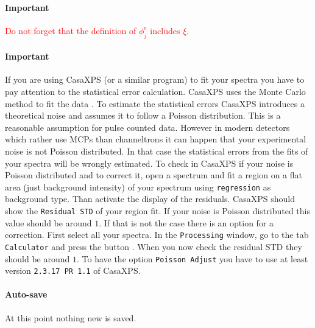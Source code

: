 \documentclass[oldfontcommands,openany,oneside]{memoir}
\newcommand{\red}[1]{\textcolor{red}{#1}}
\begin{document}
\parbox{0.9\linewidth}{\paragraph{Important} \red{Do not forget that the definition of  $\phi_j^e$ includes $\xi$.}}


\parbox{0.9\linewidth}{\paragraph{Important} If you are using CasaXPS (or a similar program) to fit your spectra you have to pay attention to the statistical error calculation. CasaXPS uses the Monte Carlo method to fit the data \cite{Mercurio2013}. To estimate the statistical errors CasaXPS introduces a theoretical noise and assumes it to follow a Poisson distribution. This is a reasonable assumption for pulse counted data. However in modern detectors which rather use MCPs than channeltrons it can happen that your experimental noise is not Poisson distributed. In that case the statistical errors from the fits of your spectra will be wrongly estimated. To check in CasaXPS if your noise is Poisson distributed and to correct it, open a spectrum and fit a region on a flat area (just background intensity) of your spectrum using \texttt{regression} as background type. Than activate the display of the residuals. CasaXPS should show the \texttt{Residual STD} of your region fit. If your noise is Poisson distributed this value should be around $1$. If that is not the case there is an option for a correction. First select all your spectra. In the \texttt{Processing} window, go to the tab \texttt{Calculator} and press the button . When you now check the residual STD they should be around $1$. To have the option \texttt{Poisson Adjust} you have to use at least version \texttt{2.3.17 PR 1.1} of CasaXPS.}


  \paragraph{Auto-save} At this point nothing new is saved. 


\end{document}
